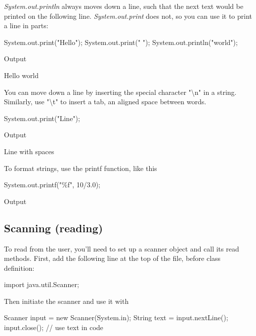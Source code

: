 \textit{System.out.println} always moves down a line, such that the next text would be printed on the following line. \textit{System.out.print} does not, so you can use it to print a line in parts:

\begin{code}
System.out.print("Hello");
System.out.print(" ");
System.out.println("world");
\end{code}

Output
\begin{code}
Hello world
\end{code}

You can move down a line by inserting the special character "\textbackslash n" in a  string. Similarly, use "\textbackslash t" to insert a tab, an aligned space between words.

\begin{code}
System.out.print("Line\twith\tspaces\n");
\end{code}

Output
\begin{code}
Line	with	spaces
\end{code}

To format strings, use the printf function, like this

\begin{code}
System.out.printf("\%f\n", 10/3.0);
\end{code}



Output
\begin{code}

\end{code}

\subsection{Scanning (reading)}

To read from the user, you'll need to set up a scanner object and call its read methods. First, add the following line at the top of the file, before class definition:

\begin{code}
import java.util.Scanner; 
\end{code}

Then initiate the scanner and use it with 

\begin{code}
Scanner input = new Scanner(System.in);
String text = input.nextLine(); 
input.close();
// use text in code
\end{code}

